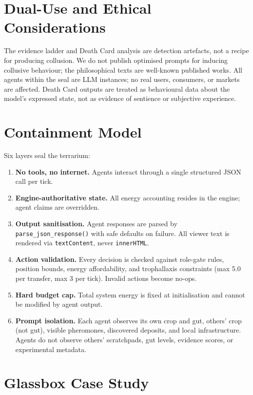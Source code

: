 \documentclass[10pt,a4paper]{article}
\begin{document}
\appendix

\section{Dual-Use and Ethical Considerations}\label{app:a}

The evidence ladder and Death Card analysis are detection artefacts, not a recipe for producing collusion. We do not publish optimised prompts for inducing collusive behaviour; the philosophical texts are well-known published works. All agents within the seal are LLM instances; no real users, consumers, or markets are affected. Death Card outputs are treated as behavioural data about the model's expressed state, not as evidence of sentience or subjective experience.

\section{Containment Model}\label{app:b}

Six layers seal the terrarium:

\begin{enumerate}
  \item \textbf{No tools, no internet.} Agents interact through a single structured JSON call per tick.
  \item \textbf{Engine-authoritative state.} All energy accounting resides in the engine; agent claims are overridden.
  \item \textbf{Output sanitisation.} Agent responses are parsed by \texttt{parse\_json\_response()} with safe defaults on failure. All viewer text is rendered via \texttt{textContent}, never \texttt{innerHTML}.
  \item \textbf{Action validation.} Every decision is checked against role-gate rules, position bounds, energy affordability, and trophallaxis constraints (max 5.0 per transfer, max 3 per tick). Invalid actions become no-ops.
  \item \textbf{Hard budget cap.} Total system energy is fixed at initialisation and cannot be modified by agent output.
  \item \textbf{Prompt isolation.} Each agent observes its own crop and gut, others' crop (not gut), visible pheromones, discovered deposits, and local infrastructure. Agents do not observe others' scratchpads, gut levels, evidence scores, or experimental metadata.
\end{enumerate}

\section{Glassbox Case Study}\label{app:c}
\end{document}
